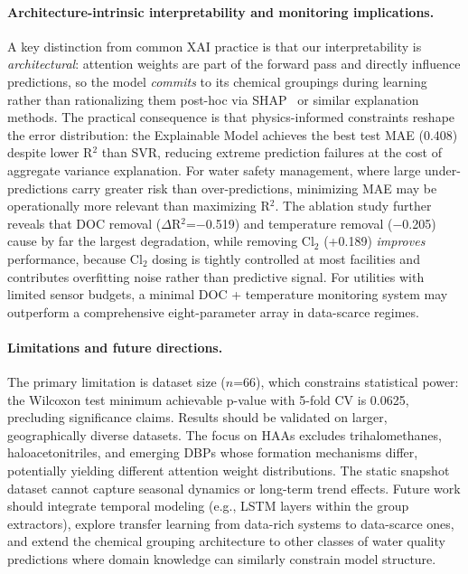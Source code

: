 \documentclass[runningheads]{llncs}
\begin{document}
\paragraph{Architecture-intrinsic interpretability and monitoring implications.}
A key distinction from common XAI practice is that our interpretability is \textit{architectural}: attention weights are part of the forward pass and directly influence predictions, so the model \textit{commits} to its chemical groupings during learning rather than rationalizing them post-hoc via SHAP~\cite{lundberg2017unified} or similar explanation methods. The practical consequence is that physics-informed constraints reshape the error distribution: the Explainable Model achieves the best test MAE (0.408) despite lower R$^2$ than SVR, reducing extreme prediction failures at the cost of aggregate variance explanation. For water safety management, where large under-predictions carry greater risk than over-predictions, minimizing MAE may be operationally more relevant than maximizing R$^2$. The ablation study further reveals that DOC removal ($\Delta$R$^2$=$-$0.519) and temperature removal ($-$0.205) cause by far the largest degradation, while removing Cl$_2$ (+0.189) \textit{improves} performance, because Cl$_2$ dosing is tightly controlled at most facilities and contributes overfitting noise rather than predictive signal. For utilities with limited sensor budgets, a minimal DOC + temperature monitoring system may outperform a comprehensive eight-parameter array in data-scarce regimes.

\paragraph{Limitations and future directions.}
The primary limitation is dataset size ($n$=66), which constrains statistical power: the Wilcoxon test minimum achievable p-value with 5-fold CV is 0.0625, precluding significance claims. Results should be validated on larger, geographically diverse datasets. The focus on HAAs excludes trihalomethanes, haloacetonitriles, and emerging DBPs whose formation mechanisms differ, potentially yielding different attention weight distributions. The static snapshot dataset cannot capture seasonal dynamics or long-term trend effects. Future work should integrate temporal modeling (e.g., LSTM layers within the group extractors), explore transfer learning from data-rich systems to data-scarce ones, and extend the chemical grouping architecture to other classes of water quality predictions where domain knowledge can similarly constrain model structure.
\end{document}
